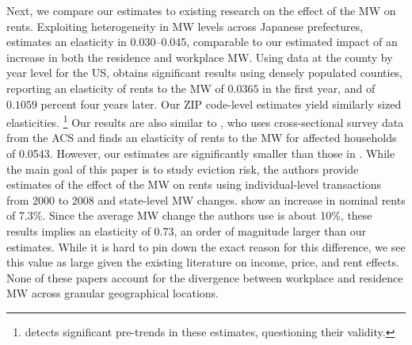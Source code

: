Next, we compare our estimates to existing research on the effect of 
the MW on rents.
Exploiting heterogeneity in MW levels across Japanese prefectures,
\textcite{Yamagishi2021} estimates an elasticity in 0.030--0.045,
comparable to our estimated impact of an increase in both the residence and 
workplace MW.
Using data at the county by year level for the US, 
\textcite[][, Tables 1 and 2]{Yamagishi2019} obtains significant results 
using densely populated counties, reporting an elasticity of rents to the MW 
of $0.0365$ in the first year, and of $0.1059$ percent four years later.
Our ZIP code-level estimates yield similarly sized elasticities.%
\footnote{\textcite[][Table 3]{Yamagishi2019} detects significant pre-trends in
    these estimates, questioning their validity.} 
Our results are also similar to \textcite[][, Table 1]{Hughes2020}, who uses 
cross-sectional survey data from the ACS and finds an elasticity of rents to 
the MW for affected households of 0.0543.
However, our estimates are significantly smaller than those in 
\textcite{AgarwalEtAl2022}.
While the main goal of this paper is to study eviction risk, the authors 
provide estimates of the effect of the MW on rents using individual-level 
transactions from 2000 to 2008 and state-level MW changes.
\textcite[][, Section 5.1]{AgarwalEtAl2022} show an increase in nominal rents
of 7.3\%. 
Since the average MW change the authors use is about 10\%, these results implies 
an elasticity of 0.73, an order of magnitude larger than our estimates.
While it is hard to pin down the exact reason for this difference, we see this 
value as large given the existing literature on income, price, and rent effects.
None of these papers account for the divergence between workplace and residence
MW across granular geographical locations.
